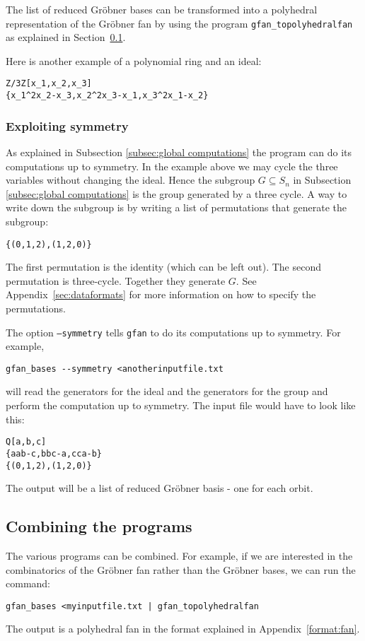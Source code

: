 The list of reduced Gr\"obner bases can be transformed into a polyhedral representation of the Gr\"obner fan by using the program \texttt{gfan\_topolyhedralfan} as explained in Section~\ref{subsec:combining}.

Here is another example of a polynomial ring and an ideal:
\begin{verbatim}
Z/3Z[x_1,x_2,x_3]
{x_1^2x_2-x_3,x_2^2x_3-x_1,x_3^2x_1-x_2}
\end{verbatim}

\subsubsection{Exploiting symmetry}
\label{sec:symmtry}
As explained in Subsection \ref{subsec:global computations} the program can do its computations up to symmetry. In the example above we may cycle the three variables without changing the ideal. Hence the subgroup $G\subseteq S_n$ in Subsection \ref{subsec:global computations} is the group generated by a three cycle. A way to write down the subgroup is by writing a list of permutations that generate the subgroup:
\begin{verbatim}
{(0,1,2),(1,2,0)}
\end{verbatim}
The first permutation is the identity (which can be left out). The second permutation is three-cycle. Together they generate $G$. See Appendix~\ref{sec:dataformats} for more information on how to specify the permutations.

The option \texttt{--symmetry} tells \texttt{gfan} to do its computations up to symmetry. For example,
\begin{verbatim}
gfan_bases --symmetry <anotherinputfile.txt 
\end{verbatim}
will read the generators for the ideal and the generators for the group and perform the computation up to symmetry. The input file would have to look like this:
\begin{verbatim}
Q[a,b,c]
{aab-c,bbc-a,cca-b}
{(0,1,2),(1,2,0)}
\end{verbatim}
The output will be a list of reduced Gr\"obner basis - one for each orbit.

\subsection{Combining the programs}
\label{subsec:combining}
The various \name programs can be combined. For example, if we are interested in the combinatorics of the Gr\"obner fan rather than the Gr\"obner bases, we can run the command:
\begin{verbatim}
gfan_bases <myinputfile.txt | gfan_topolyhedralfan
\end{verbatim}
The output is a polyhedral fan in the format explained in Appendix~\ref{format:fan}.

